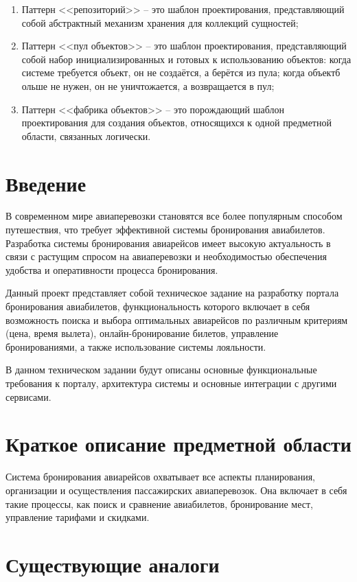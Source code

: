 \begin{enumerate}
    \item Паттерн <<репозиторий>> -- это шаблон проектирования, представляющий собой абстрактный механизм хранения для коллекций сущностей;
    \item Паттерн <<пул объектов>> -- это шаблон проектирования, представляющий собой набор инициализированных и готовых к использованию объектов: когда системе требуется объект, он не создаётся, а берётся из пула; когда объектб ольше не нужен, он не уничтожается, а возвращается в пул;
    \item Паттерн <<фабрика объектов>> -- это порождающий шаблон проектирования для создания объектов, относящихся к одной предметной области, связанных логически.
\end{enumerate}

\section*{Введение}
В современном мире авиаперевозки становятся все более популярным способом путешествия, что требует эффективной системы бронирования авиабилетов. Разработка системы бронирования авиарейсов имеет высокую актуальность в связи с растущим спросом на авиаперевозки и необходимостью обеспечения удобства и оперативности процесса бронирования.

Данный проект представляет собой техническое задание на разработку портала бронирования авиабилетов, функциональность которого включает в себя возможность поиска и выбора оптимальных авиарейсов по различным критериям (цена, время вылета), онлайн-бронирование билетов, управление бронированиями, а также использование системы лояльности. 

В данном техническом задании будут описаны основные функциональные требования к порталу, архитектура системы и основные интеграции с другими сервисами.

\section*{Краткое описание предметной области}

Система бронирования авиарейсов охватывает все аспекты планирования, организации и осуществления пассажирских авиаперевозок. Она включает в себя такие процессы, как поиск и сравнение авиабилетов, бронирование мест, управление тарифами и скидками.

\section*{Существующие аналоги}

